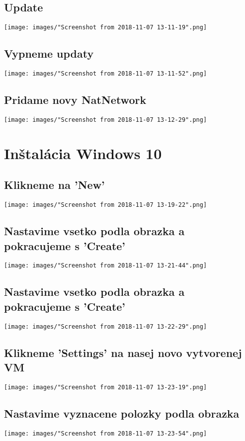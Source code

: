 \documentclass[slovak]{article}
\begin{document}
  \subsection{Update}
  \texttt{[image: images/"Screenshot from 2018-11-07 13-11-19".png]}
  \subsection{Vypneme updaty}
  \texttt{[image: images/"Screenshot from 2018-11-07 13-11-52".png]}
  \subsection{Pridame novy NatNetwork}
  \texttt{[image: images/"Screenshot from 2018-11-07 13-12-29".png]}

  \newpage
  \section{Inštalácia Windows 10}
  \subsection{Klikneme na 'New'}
  \texttt{[image: images/"Screenshot from 2018-11-07 13-19-22".png]}
  \subsection{Nastavime vsetko podla obrazka a pokracujeme s 'Create'}
  \texttt{[image: images/"Screenshot from 2018-11-07 13-21-44".png]}
  \subsection{Nastavime vsetko podla obrazka a pokracujeme s 'Create'}
  \texttt{[image: images/"Screenshot from 2018-11-07 13-22-29".png]}
  \subsection{Klikneme 'Settings' na nasej novo vytvorenej VM}
  \texttt{[image: images/"Screenshot from 2018-11-07 13-23-19".png]}
  \subsection{Nastavime vyznacene polozky podla obrazka}
  \texttt{[image: images/"Screenshot from 2018-11-07 13-23-54".png]}
\end{document}
